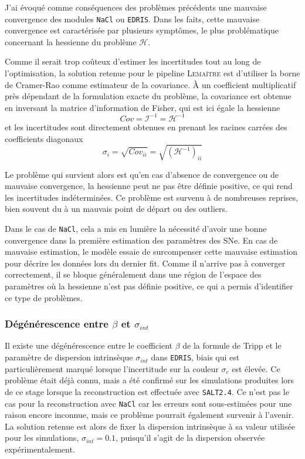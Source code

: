 \documentclass{book}
\def\lemaitre{\textsc{Lemaître}\xspace}
\def\nacl{\texttt{NaCl}\xspace}
\def\edris{\texttt{EDRIS}\xspace}
\def\saltd{\texttt{SALT2.4}\xspace}
\let\mcl\mathcal
\begin{document}
J'ai évoqué comme conséquences des problèmes précédents une mauvaise convergence des modules \nacl ou \edris. Dans les faits, cette mauvaise convergence est caractérisée par plusieurs symptômes, le plus problématique concernant la hessienne du problème $\mcl H$.

Comme il serait trop coûteux d'estimer les incertitudes tout au long de l'optimisation, la solution retenue pour le pipeline \lemaitre est d'utiliser la borne de Cramer-Rao comme estimateur de la covariance. À un coefficient multiplicatif près dépendant de la formulation exacte du problème, la covariance est obtenue en inversant la matrice d'information de Fisher, qui est ici égale la hessienne 
\begin{equation}
	Cov = \mcl I^{-1} = \mcl H^{-1}
\end{equation}
et les incertitudes sont directement obtenues en prenant les racines carrées des coefficients diagonaux
\begin{equation}
	\sigma_i = \sqrt{Cov_{ii}} = \sqrt{(\mcl H^{-1})_{ii}}
\end{equation}

Le problème qui survient alors est qu'en cas d'absence de convergence ou de mauvaise convergence, la hessienne peut ne pas être définie positive, ce qui rend les incertitudes indéterminées. Ce problème est survenu à de nombreuses reprises, bien souvent du à un mauvais point de départ ou des outliers.

Dans le cas de \nacl, cela a mis en lumière la nécessité d'avoir une bonne convergence dans la première estimation des paramètres des SNe. En cas de mauvaise estimation, le modèle essaie de surcompenser cette mauvaise estimation pour décrire les données lors du dernier fit. Comme il n'arrive pas à converger correctement, il se bloque généralement dans une région de l'espace des paramètres où la hessienne n'est pas définie positive, ce qui a permis d'identifier ce type de problèmes.

\subsubsection{Dégénérescence entre $\beta$ et $\sigma_{int}$} 

Il existe une dégénérescence entre le coefficient $\beta$ de la formule de Tripp et le paramètre de dispersion intrinsèque $\sigma_{int}$ dans \edris, biais qui est particulièrement marqué lorsque l'incertitude sur la couleur $\sigma_c$ est élevée. Ce problème était déjà connu, mais a été confirmé sur les simulations produites lors de ce stage lorsque la reconstruction est effectuée avec \saltd. Ce n'est pas le cas pour la reconstruction avec \nacl car les erreurs sont sous-estimées pour une raison encore inconnue, mais ce problème pourrait également survenir à l'avenir. La solution retenue est alors de fixer la dispersion intrinsèque à sa valeur utilisée pour les simulations, $\sigma_{int} = 0.1$, puisqu'il s'agit de la dispersion observée expérimentalement.
\end{document}
